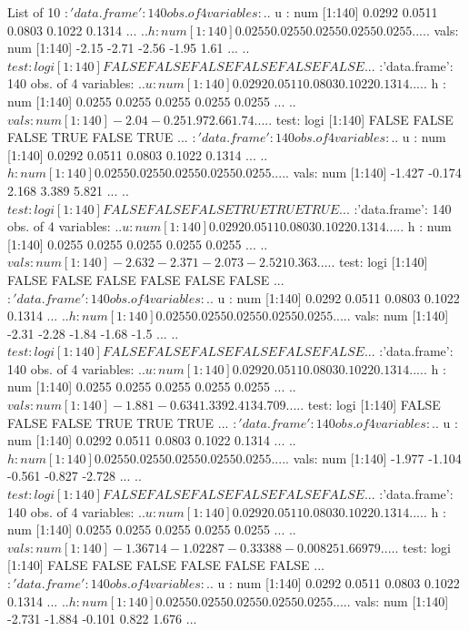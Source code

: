 \documentclass[a4paper]{scrartcl}
\begin{document}
\begin{enumerate}[label=\textit{Step \arabic*.}, leftmargin=1.45cm]
\begin{Schunk}
\begin{Soutput}
List of 10
 $ :'data.frame':	140 obs. of  4 variables:
  ..$ u   : num [1:140] 0.0292 0.0511 0.0803 0.1022 0.1314 ...
  ..$ h   : num [1:140] 0.0255 0.0255 0.0255 0.0255 0.0255 ...
  ..$ vals: num [1:140] -2.15 -2.71 -2.56 -1.95 1.61 ...
  ..$ test: logi [1:140] FALSE FALSE FALSE FALSE FALSE FALSE ...
 $ :'data.frame':	140 obs. of  4 variables:
  ..$ u   : num [1:140] 0.0292 0.0511 0.0803 0.1022 0.1314 ...
  ..$ h   : num [1:140] 0.0255 0.0255 0.0255 0.0255 0.0255 ...
  ..$ vals: num [1:140] -2.04 -0.25 1.97 2.66 1.74 ...
  ..$ test: logi [1:140] FALSE FALSE FALSE TRUE FALSE TRUE ...
 $ :'data.frame':	140 obs. of  4 variables:
  ..$ u   : num [1:140] 0.0292 0.0511 0.0803 0.1022 0.1314 ...
  ..$ h   : num [1:140] 0.0255 0.0255 0.0255 0.0255 0.0255 ...
  ..$ vals: num [1:140] -1.427 -0.174 2.168 3.389 5.821 ...
  ..$ test: logi [1:140] FALSE FALSE FALSE TRUE TRUE TRUE ...
 $ :'data.frame':	140 obs. of  4 variables:
  ..$ u   : num [1:140] 0.0292 0.0511 0.0803 0.1022 0.1314 ...
  ..$ h   : num [1:140] 0.0255 0.0255 0.0255 0.0255 0.0255 ...
  ..$ vals: num [1:140] -2.632 -2.371 -2.073 -2.521 0.363 ...
  ..$ test: logi [1:140] FALSE FALSE FALSE FALSE FALSE FALSE ...
 $ :'data.frame':	140 obs. of  4 variables:
  ..$ u   : num [1:140] 0.0292 0.0511 0.0803 0.1022 0.1314 ...
  ..$ h   : num [1:140] 0.0255 0.0255 0.0255 0.0255 0.0255 ...
  ..$ vals: num [1:140] -2.31 -2.28 -1.84 -1.68 -1.5 ...
  ..$ test: logi [1:140] FALSE FALSE FALSE FALSE FALSE FALSE ...
 $ :'data.frame':	140 obs. of  4 variables:
  ..$ u   : num [1:140] 0.0292 0.0511 0.0803 0.1022 0.1314 ...
  ..$ h   : num [1:140] 0.0255 0.0255 0.0255 0.0255 0.0255 ...
  ..$ vals: num [1:140] -1.881 -0.634 1.339 2.413 4.709 ...
  ..$ test: logi [1:140] FALSE FALSE FALSE TRUE TRUE TRUE ...
 $ :'data.frame':	140 obs. of  4 variables:
  ..$ u   : num [1:140] 0.0292 0.0511 0.0803 0.1022 0.1314 ...
  ..$ h   : num [1:140] 0.0255 0.0255 0.0255 0.0255 0.0255 ...
  ..$ vals: num [1:140] -1.977 -1.104 -0.561 -0.827 -2.728 ...
  ..$ test: logi [1:140] FALSE FALSE FALSE FALSE FALSE FALSE ...
 $ :'data.frame':	140 obs. of  4 variables:
  ..$ u   : num [1:140] 0.0292 0.0511 0.0803 0.1022 0.1314 ...
  ..$ h   : num [1:140] 0.0255 0.0255 0.0255 0.0255 0.0255 ...
  ..$ vals: num [1:140] -1.36714 -1.02287 -0.33388 -0.00825 1.66979 ...
  ..$ test: logi [1:140] FALSE FALSE FALSE FALSE FALSE FALSE ...
 $ :'data.frame':	140 obs. of  4 variables:
  ..$ u   : num [1:140] 0.0292 0.0511 0.0803 0.1022 0.1314 ...
  ..$ h   : num [1:140] 0.0255 0.0255 0.0255 0.0255 0.0255 ...
  ..$ vals: num [1:140] -2.731 -1.884 -0.101 0.822 1.676 ...

\end{Soutput}
\end{Schunk}
\end{enumerate}
\end{document}
